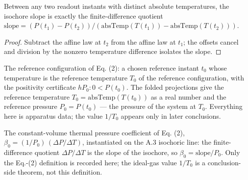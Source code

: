 \begin{lemma}
\label{lem:IPhO2026Problems_problem_IPhO_2026_4_A_5:IsIsochoricLinear_slope_eq_div}
Between any two readout instants with distinct absolute temperatures, the
isochore slope is exactly the finite-difference quotient
$\mathrm{slope} = (P(t_1) - P(t_2))/(\mathrm{absTemp}(T(t_1)) -
\mathrm{absTemp}(T(t_2)))$.
\end{lemma}
\begin{proof}
Subtract the affine law at $t_2$ from the affine law at $t_1$; the offsets
cancel and division by the nonzero temperature difference isolates the
slope.
\end{proof}

\begin{definition}
\label{def:IPhO2026Problems_problem_IPhO_2026_4_A_5:IsReferenceState}
The reference configuration of Eq. (2): a chosen reference instant $t_0$
whose temperature is the reference temperature $T_0$ of the reference
configuration, with the positivity certificate $hP_0 : 0 < P(t_0)$.  The
folded projections give the reference temperature
$T_0 = \mathrm{absTemp}(T(t_0))$ as a real number and the reference
pressure $P_0 = P(t_0)$ --- the pressure of the system at $T_0$.
Everything here is apparatus data; the value $1/T_0$ appears only in
later conclusions.
\end{definition}

\begin{definition}
\label{def:IPhO2026Problems_problem_IPhO_2026_4_A_5:IsIsochoricLinear_thermalPressureCoefficient}
The constant-volume thermal pressure coefficient of Eq. (2),
$\beta_0 = (1/P_0)\,(\Delta P/\Delta T)$, instantiated on the A.3
isochoric line: the finite-difference quotient $\Delta P/\Delta T$ is the
slope of the isochore, so $\beta_0 = \mathrm{slope}/P_0$.  Only the
Eq.-(2) definition is recorded here; the ideal-gas value $1/T_0$ is a
conclusion-side theorem, not this definition.
\end{definition}

